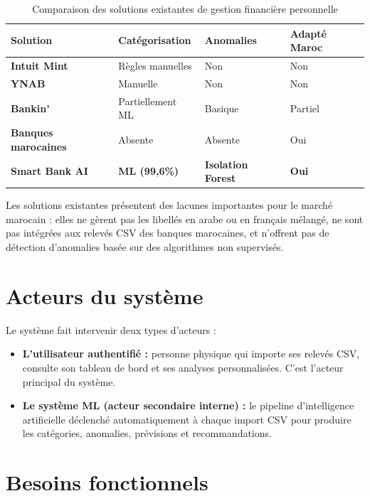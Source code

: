 \documentclass[12pt,a4paper]{report}
\begin{document}
\begin{table}[H]
  \centering
  \caption{Comparaison des solutions existantes de gestion financière personnelle}
  \label{tab:comparaison-existant}
  \renewcommand{\arraystretch}{1.3}
  \begin{tabularx}{\textwidth}{>{\bfseries}lXXX}
    \toprule
    Solution & Catégorisation & Anomalies & Adapté Maroc \\
    \midrule
    Intuit Mint & Règles manuelles & Non & Non \\
    YNAB & Manuelle & Non & Non \\
    Bankin' & Partiellement ML & Basique & Partiel \\
    Banques marocaines & Absente & Absente & Oui \\
    \textbf{Smart Bank AI} & \textbf{ML (99,6\%)} & \textbf{Isolation Forest} & \textbf{Oui} \\
    \bottomrule
  \end{tabularx}
\end{table}

Les solutions existantes présentent des lacunes importantes pour le marché
marocain : elles ne gèrent pas les libellés en arabe ou en français mélangé,
ne sont pas intégrées aux relevés CSV des banques marocaines, et n'offrent
pas de détection d'anomalies basée sur des algorithmes non supervisés.

\section{Acteurs du système}

Le système fait intervenir deux types d'acteurs :

\begin{itemize}[noitemsep]
  \item \textbf{L'utilisateur authentifié :} personne physique qui importe ses
    relevés CSV, consulte son tableau de bord et ses analyses personnalisées.
    C'est l'acteur principal du système.
  \item \textbf{Le système ML (acteur secondaire interne) :} le pipeline
    d'intelligence artificielle déclenché automatiquement à chaque import
    CSV pour produire les catégories, anomalies, prévisions et recommandations.
\end{itemize}

\section{Besoins fonctionnels}
\end{document}
